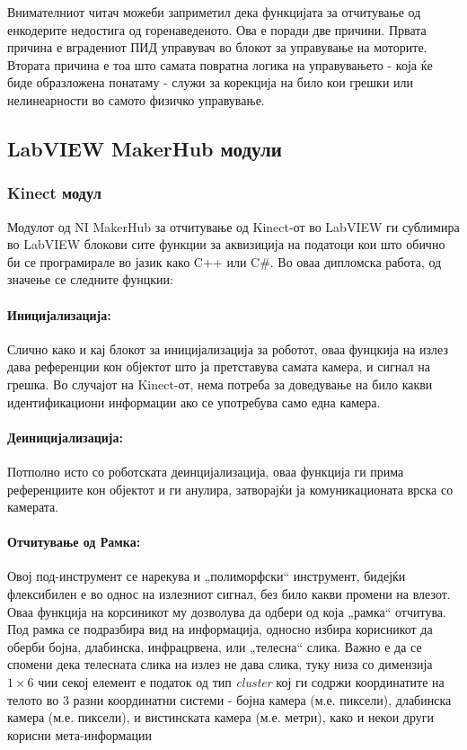 \documentclass[12pt]{article}
\begin{document}

    Внимателниот читач можеби заприметил дека функцијата за отчитување од енкодерите недостига од горенаведеното. Ова е поради две причини. Првата причина е вградениот ПИД управувач во блокот за управување на моторите. Втората причина е тоа што самата повратна логика на управувањето - која ќе биде образложена понатаму - служи за корекција на било кои грешки или нелинеарности во самото физичко управување.

  \subsection{LabVIEW MakerHub модули}
    \subsubsection{Kinect модул}
      Модулот од NI MakerHub за отчитување од Kinect-от во LabVIEW ги сублимира во LabVIEW блокови сите функции за аквизиција на податоци кои што обично би се програмирале во јазик како C++ или C\#. Во оваа дипломска работа, од значење се следните фунцкии:

      \paragraph{Иницијализација:\\}
        Слично како и кај блокот за иницијализација за роботот, оваа фунцкија на излез дава референции кон објектот што ја претставува самата камера, и сигнал на грешка. Во случајот на Kinect-от, нема потреба за доведување на било какви идентификациони информации ако се употребува само една камера.

      \paragraph{Деиницијализација:\\}
        Потполно исто со роботската деинцијализација, оваа функција ги прима референциите кон објектот и ги анулира, затворајќи ја комуникационата врска со камерата.

      \paragraph{Отчитување од Рамка:\\}
        Овој под-инструмент се нарекува и „полиморфски“ инструмент, бидејќи флексибилен е во однос на излезниот сигнал, без било какви промени на влезот. Оваа функција на корсиникот му дозволува да одбери од која „рамка“ отчитува. Под рамка се подразбира вид на информација, односно избира корисникот да оберби бојна, длабинска, инфрацрвена, или „телесна“ слика. Важно е да се спомени дека телесната слика на излез не дава слика, туку низа со димензија $1 \times 6$ чии секој елемент е податок од тип \textit{cluster} кој ги содржи координатите на телото во 3 разни координатни системи - бојна камера (м.е. пиксели), длабинска камера (м.е. пиксели), и вистинската камера (м.е. метри), како и некои други корисни мета-информации
\end{document}

